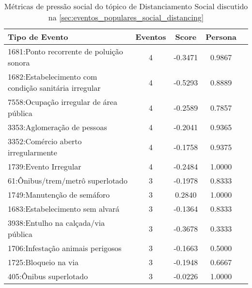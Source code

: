 \begin{table}[htbp]
	\centering
	\caption{Métricas de pressão social do tópico de Distanciamento Social discutido na \autoref{sec:eventos_populares_social_distancing}}
	\label{tab:eventos_populares_social_distancing}
	\begin{tabular}{|l|c|c|c|c|}
		\hline
		\textbf{Tipo de Evento}                               & \textbf{Eventos} & \textbf{Score} & \textbf{Persona} \\
		\hline
		1681:Ponto recorrente de poluição sonora              & 4                & -0.3471        & 0.9867           \\
		\hline
		1682:Estabelecimento com condição sanitária irregular & 4                & -0.5293        & 0.8889           \\
		\hline
		7558:Ocupação irregular de área pública               & 4                & -0.2589        & 0.7857           \\
		\hline
		3353:Aglomeração de pessoas                           & 4                & -0.2041        & 0.9365           \\
		\hline
		3352:Comércio aberto irregularmente                   & 4                & -0.1758        & 0.9375           \\
		\hline
		1739:Evento Irregular                                 & 4                & -0.2484        & 1.0000           \\
		\hline
		61:Ônibus/trem/metrô superlotado                      & 3                & -0.1978        & 0.8333           \\
		\hline
		1749:Manutenção de semáforo                           & 3                & 0.2840         & 1.0000           \\
		\hline
		1683:Estabelecimento sem alvará                       & 3                & -0.1364        & 0.8333           \\
		\hline
		3938:Entulho na calçada/via pública                   & 3                & -0.3678        & 0.3333           \\
		\hline
		1706:Infestação animais perigosos                     & 3                & -0.1663        & 0.5000           \\
		\hline
		1725:Bloqueio na via                                  & 3                & -0.1948        & 0.6667           \\
		\hline
		405:Ônibus superlotado                                & 3                & -0.0226        & 1.0000           \\

\end{tabular}
\end{table}
